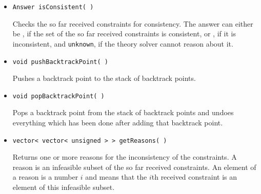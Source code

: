 \begin{itemize}
    \item \begin{verbatim}Answer isConsistent( )\end{verbatim}
    	Checks the so far received constraints for consistency. The answer can either be
    	\true, if the set of the so far received constraints is consistent, or 
    	\false, if it is inconsistent, and \texttt{unknown}, if the theory 
    	solver cannot reason about it.
    \item \begin{verbatim}void pushBacktrackPoint( )\end{verbatim}
    	Pushes a backtrack point to the stack of backtrack points.
    \item \begin{verbatim}void popBacktrackPoint( )\end{verbatim}
    	Pops a backtrack point from the stack of backtrack points and undoes everything
		which has been done after adding that backtrack point.
    \item \begin{verbatim}vector< vector< unsigned > > getReasons( )\end{verbatim}
    	Returns one or more reasons for the inconsistency of the constraints. A reason
    	is an infeasible subset of the so far received constraints. An element of a reason
    	is a number $i$ and means that the $i$th received constraint is an element of
    	this infeasible subset.
\end{itemize}

